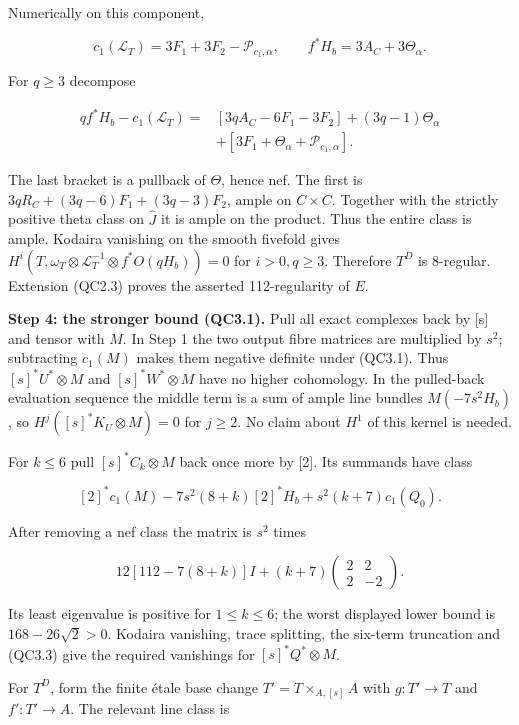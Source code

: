 Numerically on this component,

\[
 c_1(\mathcal L_T)=3F_1+3F_2-\mathcal P_{c_1,\alpha},\qquad
 f^*H_b=3A_C+3\Theta_\alpha.
\]

For \(q\ge 3\) decompose

\[
\begin{split}
 qf^*H_b-c_1(\mathcal L_T)
 ={}&[3qA_C-6F_1-3F_2]+(3q-1)\Theta_\alpha\\
 &+[3F_1+\Theta_\alpha+\mathcal P_{c_1,\alpha}].
\end{split}
\]

The last bracket is a pullback of \(\Theta\), hence nef. The first is
\(3qR_C+(3q-6)F_{1}+(3q-3)F_{2}\), ample on \(C\times C\). Together with
the strictly positive theta class on \(\widehat{J}\) it is ample on the
product. Thus the entire class is ample. Kodaira vanishing on the smooth
fivefold gives
\(H^i(T,\omega_T\otimes\mathcal L_T^{-1}\otimes f^*O(qH_b))=0\) for
\(i>0,q\ge 3\). Therefore \(T^D\) is 8-regular. Extension (QC2.3) proves
the asserted 112-regularity of \(E\).

\textbf{Step 4: the stronger bound (QC3.1).} Pull all exact complexes
back by {[}s{]} and tensor with \(M\). In Step 1 the two output fibre
matrices are multiplied by \(s^{2}\); subtracting \(c_{1}(M)\) makes
them negative definite under (QC3.1). Thus \([s]^*U^*\otimes M\) and
\([s]^*W^*\otimes M\) have no higher cohomology. In the pulled-back
evaluation sequence the middle term is a sum of ample line bundles
\(M(-7s^{2}H_b)\), so \(H^j([s]^*K_U\otimes M)=0\) for \(j\ge 2\). No
claim about \(H^{1}\) of this kernel is needed.

For \(k\le 6\) pull \([s]^*C_k\otimes M\) back once more by {[}2{]}. Its
summands have class

\[
 [2]^*c_1(M)-7s^2(8+k)[2]^*H_b+s^2(k+7)c_1(Q_0).
\]

After removing a nef class the matrix is \(s^{2}\) times

\[
 12[112-7(8+k)]I+(k+7)\begin{pmatrix}2&2\\2&-2\end{pmatrix}.
\]

Its least eigenvalue is positive for \(1\le k\le 6\); the worst
displayed lower bound is \(168-26\sqrt 2>0\). Kodaira vanishing, trace
splitting, the six-term truncation and (QC3.3) give the required
vanishings for \([s]^*Q^*\otimes M\).

For \(T^D\), form the finite étale base change \(T'=T\times_{A,[s]}A\)
with \(g:T'\to T\) and \(f':T'\to A\). The relevant line class is

